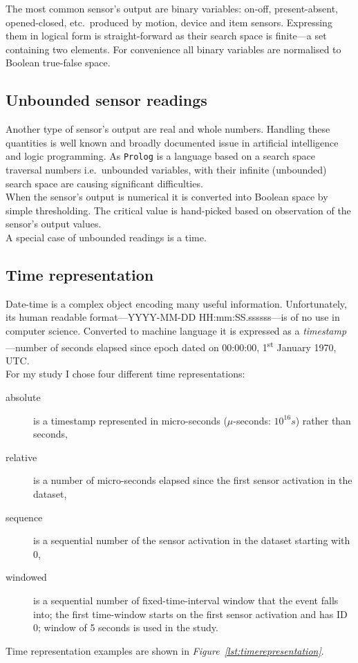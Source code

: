 \documentclass[10pt, a4paper, pdflatex, leqno, twoside, openright]{report}
\newcommand{\ts}{\textsuperscript}
\begin{document}
The most common sensor's output are binary variables: on-off, present-absent, opened-closed, etc.\ produced by motion, device and item sensors. Expressing them in logical form is straight-forward as their search space is finite---a set containing two elements. For convenience all binary variables are normalised to Boolean true-false space.

    \subsection{Unbounded sensor readings}
Another type of sensor's output are real and whole numbers. Handling these quantities is well known and broadly documented issue in artificial intelligence and logic programming. As \texttt{Prolog} is a language based on a search space traversal numbers i.e.\ unbounded variables, with their infinite (unbounded) search space are causing significant difficulties.\\

When the sensor's output is numerical it is converted into Boolean space by simple thresholding. The critical value is hand-picked based on observation of the sensor's output values.\\
A special case of unbounded readings is a time.

    \subsection{Time representation\label{sec:timeRepresentation}}
Date-time is a complex object encoding many useful information. Unfortunately, its human readable format---YYYY-MM-DD HH:mm:SS.ssssss---is of no use in computer science. Converted to machine language it is expressed as a \emph{timestamp}---number of seconds elapsed since epoch dated on 00:00:00, 1\ts{st} January 1970, UTC.\\

For my study I chose four different time representations:
\begin{description}
\item[absolute] is a timestamp represented in micro-seconds ($\mu$-seconds: $10^{16}s$) rather than seconds,
\item[relative] is a number of micro-seconds elapsed since the first sensor activation in the dataset,
\item[sequence] is a sequential number of the sensor activation in the dataset starting with $0$,
\item[windowed] is a sequential number of fixed-time-interval window that the event falls into; the first time-window starts on the first sensor activation and has ID $0$; window of 5 seconds is used in the study.
\end{description}
Time representation examples are shown in \emph{Figure~\ref{lst:timerepresentation}}.\\
\end{document}
